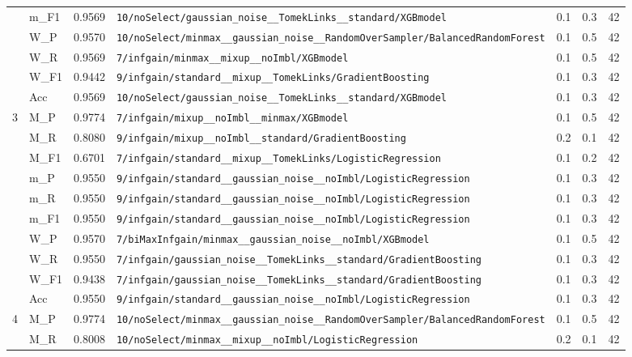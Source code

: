 \begin{table}[htbp]
\begin{tabular}{|c|l|c|>{\ttfamily\footnotesize}p{7.2cm}|c|c|c|}
 & m\_F1 & 0.9569 & \texttt{10/noSelect/gaussian\_noise\_\_TomekLinks\_\_standard/XGBmodel} & 0.1 & 0.3  & 42 \\ 
 & W\_P & 0.9570 & \texttt{10/noSelect/minmax\_\_gaussian\_noise\_\_RandomOverSampler/BalancedRandomForest} & 0.1 & 0.5  & 42 \\ 
 & W\_R & 0.9569 & \texttt{7/infgain/minmax\_\_mixup\_\_noImbl/XGBmodel} & 0.1 & 0.5  & 42 \\ 
 & W\_F1 & 0.9442 & \texttt{9/infgain/standard\_\_mixup\_\_TomekLinks/GradientBoosting} & 0.1 & 0.3  & 42 \\ 
 & Acc & 0.9569 & \texttt{10/noSelect/gaussian\_noise\_\_TomekLinks\_\_standard/XGBmodel} & 0.1 & 0.3  & 42 \\ 
\hline
\multirow{10}{*}{3} & M\_P & 0.9774 & \texttt{7/infgain/mixup\_\_noImbl\_\_minmax/XGBmodel} & 0.1 & 0.5  & 42 \\ 
 & M\_R & 0.8080 & \texttt{9/infgain/mixup\_\_noImbl\_\_standard/GradientBoosting} & 0.2 & 0.1  & 42 \\ 
 & M\_F1 & 0.6701 & \texttt{7/infgain/standard\_\_mixup\_\_TomekLinks/LogisticRegression} & 0.1 & 0.2  & 42 \\ 
 & m\_P & 0.9550 & \texttt{9/infgain/standard\_\_gaussian\_noise\_\_noImbl/LogisticRegression} & 0.1 & 0.3  & 42 \\ 
 & m\_R & 0.9550 & \texttt{9/infgain/standard\_\_gaussian\_noise\_\_noImbl/LogisticRegression} & 0.1 & 0.3  & 42 \\ 
 & m\_F1 & 0.9550 & \texttt{9/infgain/standard\_\_gaussian\_noise\_\_noImbl/LogisticRegression} & 0.1 & 0.3  & 42 \\ 
 & W\_P & 0.9570 & \texttt{7/biMaxInfgain/minmax\_\_gaussian\_noise\_\_noImbl/XGBmodel} & 0.1 & 0.5  & 42 \\ 
 & W\_R & 0.9550 & \texttt{7/infgain/gaussian\_noise\_\_TomekLinks\_\_standard/GradientBoosting} & 0.1 & 0.3  & 42 \\ 
 & W\_F1 & 0.9438 & \texttt{7/infgain/gaussian\_noise\_\_TomekLinks\_\_standard/GradientBoosting} & 0.1 & 0.3  & 42 \\ 
 & Acc & 0.9550 & \texttt{9/infgain/standard\_\_gaussian\_noise\_\_noImbl/LogisticRegression} & 0.1 & 0.3  & 42 \\ 
\hline
\multirow{10}{*}{4} & M\_P & 0.9774 & \texttt{10/noSelect/minmax\_\_gaussian\_noise\_\_RandomOverSampler/BalancedRandomForest} & 0.1 & 0.5  & 42 \\ 
 & M\_R & 0.8008 & \texttt{10/noSelect/minmax\_\_mixup\_\_noImbl/LogisticRegression} & 0.2 & 0.1  & 42 \\ 

\end{tabular}
\end{table}
